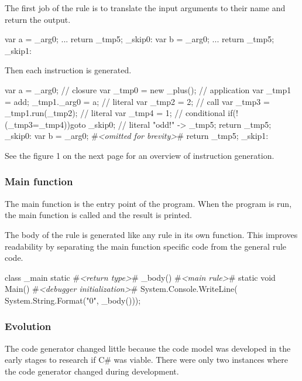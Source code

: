 The first job of the rule is to translate the input arguments to their name and return the output.

\begin{CS}
    {
        var a = _arg0; 
        ...
        return _tmp5;
    }
    _skip0:
    {
        var b = _arg0;
        ...
        return _tmp5;
    }
    _skip1:
\end{CS}

Then each instruction is generated.

\begin{CS}[escapeinside=\#\#]
    {
        var a = _arg0; 
        // closure
        var _tmp0 = new _plus(); 
        // application
        var _tmp1 = add;
        _tmp1._arg0 = a;
        // literal
        var _tmp2 = 2;
        // call
        var _tmp3 = _tmp1.run(_tmp2);
        // literal     
        var _tmp4 = 1;
        // conditional
        if(!(_tmp3=_tmp4)){goto _skip0;}
        // literal
        "odd!" -> _tmp5;
        return _tmp5;
    }
    _skip0:
    {
        var b = _arg0;
        #\textit{<omitted for brevity>}#
        return _tmp5;
    }
    _skip1:
\end{CS}

See the figure 1 on the next page for an overview of instruction generation.

\subsubsection{Main function}
The main function is the entry point of the program.
When the program is run, the main function is called and the result is printed.

The body of the rule is generated like any rule in its own function.
This improves readability by separating the main function specific code from the general rule code.

\begin{CS}[escapeinside=\#\#]
class _main{
    static #\textit{<return type>}# _body(){
        #\textit{<main rule>}#
    }
    static void Main(){
        #\textit{<debugger initialization>}#
        System.Console.WriteLine(
            System.String.Format("{0}", 
                                 _body()));
    }
}
\end{CS}


\subsubsection{Evolution}
The code generator changed little because the code model was developed in the early stages to research if C\# was viable.
There were only two instances where the code generator changed during development.

